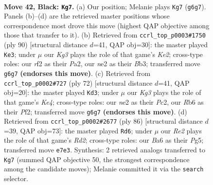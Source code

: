 \documentclass[11pt]{article}
\begin{document}
\clearpage

\begin{figure}[p]\centering
\begin{subfigure}{0.46\textwidth}\centering
\resizebox{\linewidth}{!}{%
\newchessgame
\chessboard[
  setfen={6B1/p3r3/br1p2k1/2p5/2P3P1/7K/4NR2/R7 b - - 4 42},
  showmover=false,
  pgfstyle=straightmove, color=movearrow, markmove={g6-g7}
]}
\caption{}
\end{subfigure}\hfill
\begin{subfigure}{0.46\textwidth}\centering
\resizebox{\linewidth}{!}{%
\newchessgame
\chessboard[
  setfen={8/2k5/2b5/1p6/3r3p/1BR4P/P3K1P1/8 w - - 3 46},
  showmover=false,
  pgfstyle=straightmove, color=movearrow, markmove={e2-e3}
]}
\caption{}
\end{subfigure}
\\[4pt]
\begin{subfigure}{0.46\textwidth}\centering
\resizebox{\linewidth}{!}{%
\newchessgame
\chessboard[
  setfen={8/3kb3/2r3p1/1p5p/3BK3/6RP/2P2PP1/8 w - - 3 37},
  showmover=false,
  pgfstyle=straightmove, color=movearrow, markmove={e4-d3}
]}
\caption{}
\end{subfigure}\hfill
\begin{subfigure}{0.46\textwidth}\centering
\resizebox{\linewidth}{!}{%
\newchessgame
\chessboard[
  setfen={4r1k1/5pp1/2b5/6P1/2B3r1/8/3R1P1K/2R5 w - - 0 44},
  showmover=false,
  pgfstyle=straightmove, color=movearrow, markmove={d2-d6}
]}
\caption{}
\end{subfigure}
\caption{\textbf{Move 42, Black: \texttt{Kg7}.} (a) Our position; Melanie plays \texttt{Kg7} (\texttt{g6g7}). Panels (b)--(d) are the retrieved master positions whose correspondence most drove this move (highest QAP objective among those that transfer to it). (b) Retrieved from \texttt{ccrl\_top\_p0003\#1750} (ply 90) [structural distance $d$=41, QAP obj=30]: the master played \texttt{Ke3}; under $\mu$ our \emph{Kg3} plays the role of that game's \emph{Ke2}; cross-type roles: our \emph{r}f2 as their \emph{P}a2, our \emph{n}e2 as their \emph{B}b3; transferred move \texttt{g6g7} \textbf{(endorses this move)}. (c) Retrieved from \texttt{ccrl\_top\_p0002\#727} (ply 72) [structural distance $d$=41, QAP obj=20]: the master played \texttt{Kd3}; under $\mu$ our \emph{Kg3} plays the role of that game's \emph{Ke4}; cross-type roles: our \emph{n}e2 as their \emph{P}c2, our \emph{R}b6 as their \emph{P}f2; transferred move \texttt{g6g7} \textbf{(endorses this move)}. (d) Retrieved from \texttt{ccrl\_top\_p0002\#2677} (ply 86) [structural distance $d$=39, QAP obj=73]: the master played \texttt{Rd6}; under $\mu$ our \emph{Re2} plays the role of that game's \emph{Rd2}; cross-type roles: our \emph{B}a6 as their \emph{P}g5; transferred move \texttt{e7e3}. Synthesis: 2 retrieved analogs transferred to \texttt{Kg7} (summed QAP objective 50, the strongest correspondence among the candidate moves); Melanie committed it via the \texttt{search} selector.}
\label{fig:thought-m83}
\end{figure}
\end{document}
